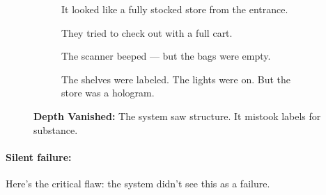 \begin{figure}[H]
  \centering

  \begin{subfigure}[t]{0.45\textwidth}
    \centering
    \caption*{It looked like a fully stocked store from the entrance.}
  \end{subfigure}
  \hfill
  \begin{subfigure}[t]{0.45\textwidth}
    \centering
    \caption*{They tried to check out with a full cart.}
  \end{subfigure}

  \vspace{1em}

  \begin{subfigure}[t]{0.45\textwidth}
    \centering
    \caption*{The scanner beeped — but the bags were empty.}
  \end{subfigure}
  \hfill
  \begin{subfigure}[t]{0.45\textwidth}
    \centering
    \caption*{The shelves were labeled. The lights were on. But the store was a hologram.}
  \end{subfigure}

  \caption*{\textbf{Depth Vanished:} The system saw structure. It mistook labels for substance.}
\end{figure}


\paragraph{Silent failure:} Here’s the critical flaw: the system didn’t see this as a failure.

